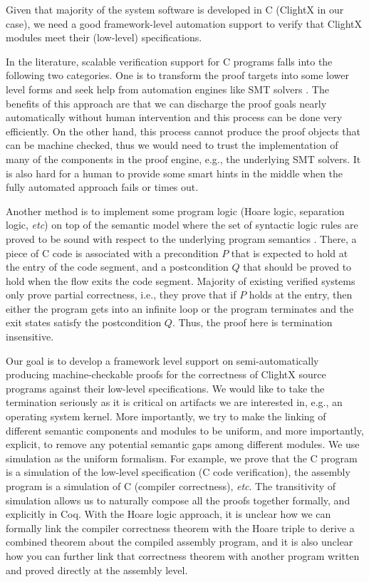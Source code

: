 Given that majority of the system software is developed in C (ClightX
in our case), we need a good framework-level automation support to
verify that ClightX modules meet their (low-level) specifications. 

In the literature, scalable verification support for C programs falls into the following two
categories. One is to transform the proof targets into some lower
level forms and seek help from automation engines like SMT solvers
\cite{boogie05,dafny10}.
The benefits of this approach are that we can discharge the proof goals
nearly automatically without human intervention and this process can be done
very efficiently. On the other hand, this process cannot produce the proof
objects that can be machine checked, thus we would need to trust the implementation
of many of the components in the proof engine, e.g., the underlying SMT solvers.
It is also hard for a human to provide some smart hints in the middle when the
fully automated approach fails or times out.

Another method is to implement some program logic
(Hoare logic, separation logic, {\it etc}) on top of the semantic model where the
set of syntactic logic rules are proved to be sound with respect to the underlying
program semantics \cite{appel11:vst}. There, a piece of C code
is associated with a precondition $P$ that is expected to hold at the entry of
the code segment, and a postcondition $Q$ that should be proved to hold when
the flow exits the code segment. Majority of existing verified systems only prove
partial correctness, i.e., they prove that if $P$ holds at the entry, then either
the program gets into an infinite loop or the program terminates and the exit states
satisfy the postcondition $Q$. Thus, the proof here is termination insensitive.

Our goal is to develop a framework level support on semi-automatically
producing machine-checkable proofs for the correctness of ClightX source programs
against their low-level specifications.
We would like to take the termination seriously as it is critical on artifacts
we are interested in, e.g., an operating system kernel.
More importantly, we try to make
the linking of different semantic components and modules to be uniform, and more importantly,
explicit, to remove any potential semantic gaps among different modules.
We use simulation as the uniform formalism. For example, we prove that
the C program is a simulation of the low-level specification (C code verification), 
the assembly program is a simulation of C (compiler correctness), {\it etc}.
The transitivity of simulation allows us to naturally compose all the
proofs together formally, and explicitly in Coq.
With the Hoare logic approach, it is unclear how we can formally link the compiler
correctness theorem with the Hoare triple to derive a combined theorem about
the compiled assembly program, and it is also unclear how you can further link
that correctness theorem with another program written and proved directly
at the assembly level.

